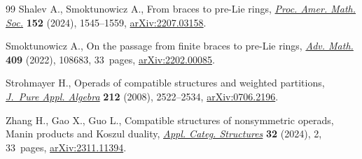 \documentclass[10pt,a4paper]{amsart}
\numberwithin{equation}{section}
\begin{document}
\begin{thebibliography}{99}
Shalev A., Smoktunowicz A., From braces to pre-{L}ie rings, \href{https://doi.org/10.1090/proc/16693}{\textit{Proc. Amer.
 Math. Soc.}} \textbf{152} (2024), 1545--1559, \href{https://arxiv.org/abs/2207.03158}{arXiv:2207.03158}.

Smoktunowicz A., On the passage from finite braces to pre-{L}ie rings,
 \href{https://doi.org/10.1016/j.aim.2022.108683}{\textit{Adv. Math.}} \textbf{409} (2022), 108683, 33~pages,
 \href{https://arxiv.org/abs/2202.00085}{arXiv:2202.00085}.

Strohmayer H., Operads of compatible structures and weighted partitions,
 \href{https://doi.org/10.1016/j.jpaa.2008.04.009}{\textit{J.~Pure Appl. Algebra}} \textbf{212} (2008), 2522--2534,
 \href{https://arxiv.org/abs/0706.2196}{arXiv:0706.2196}.

Zhang H., Gao X., Guo L., Compatible structures of nonsymmetric operads,
 {M}anin products and {K}oszul duality, \href{https://doi.org/10.1007/s10485-023-09760-x}{\textit{Appl. Categ. Structures}}
 \textbf{32} (2024), 2, 33~pages, \href{https://arxiv.org/abs/2311.11394}{arXiv:2311.11394}.

\end{thebibliography}
\end{document}
